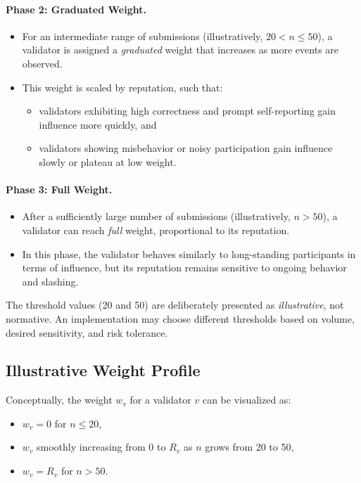 \documentclass[11pt]{article}
\begin{document}
\paragraph{Phase 2: Graduated Weight.}
\begin{itemize}[leftmargin=*]
  \item For an intermediate range of submissions (illustratively, \(20 < n \le 50\)), a validator is assigned a \emph{graduated} weight that increases as more events are observed.
  \item This weight is scaled by reputation, such that:
  \begin{itemize}
    \item validators exhibiting high correctness and prompt self-reporting gain influence more quickly, and
    \item validators showing misbehavior or noisy participation gain influence slowly or plateau at low weight.
  \end{itemize}
\end{itemize}

\paragraph{Phase 3: Full Weight.}
\begin{itemize}[leftmargin=*]
  \item After a sufficiently large number of submissions (illustratively, \(n > 50\)), a validator can reach \emph{full} weight, proportional to its reputation.
  \item In this phase, the validator behaves similarly to long-standing participants in terms of influence, but its reputation remains sensitive to ongoing behavior and slashing.
\end{itemize}

The threshold values (20 and 50) are deliberately presented as \emph{illustrative}, not normative.
An implementation may choose different thresholds based on volume, desired sensitivity, and risk tolerance.

\subsection{Illustrative Weight Profile}

Conceptually, the weight \(w_v\) for a validator \(v\) can be visualized as:
\begin{itemize}[leftmargin=*]
  \item \(w_v = 0\) for \(n \le 20\),
  \item \(w_v\) smoothly increasing from \(0\) to \(R_v\) as \(n\) grows from 20 to 50,
  \item \(w_v = R_v\) for \(n > 50\).
\end{itemize}
\end{document}
